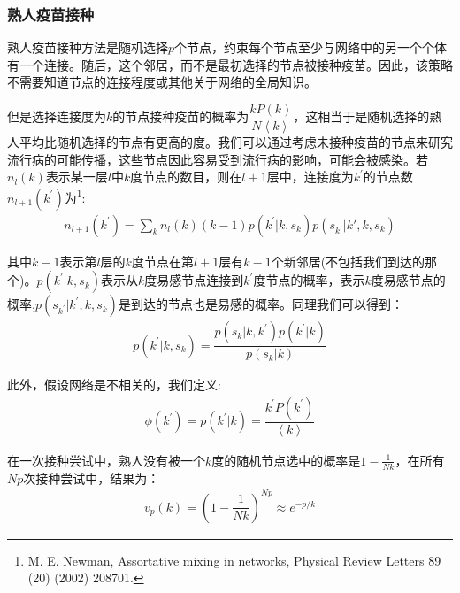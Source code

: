 \documentclass[UTF8]{ctexart}
\begin{document}
\subsubsection{熟人疫苗接种}
熟人疫苗接种方法是随机选择$p$个节点，约束每个节点至少与网络中的另一个个体有一个连接。随后，这个邻居，而不是最初选择的节点被接种疫苗。因此，该策略不需要知道节点的连接程度或其他关于网络的全局知识。
\par 但是选择连接度为$k$的节点接种疫苗的概率为$\dfrac{kP(k)}{N\left\langle k\right\rangle}$，这相当于是随机选择的熟人平均比随机选择的节点有更高的度。我们可以通过考虑未接种疫苗的节点来研究流行病的可能传播，这些节点因此容易受到流行病的影响，可能会被感染。若$n_{l}(k)$表示某一层$l$中$k$度节点的数目，则在$l+1$层中，连接度为$k^{\prime}$的节点数$n_{l+1}(k^{\prime})$为\footnote{M. E. Newman, Assortative mixing in networks, Physical Review Letters 89 (20) (2002) 208701.}:
\begin{equation}
	\begin{aligned}
		n_{l+1}(k^{\prime})=\sum\limits_{k}n_{l}(k)(k-1)p(k^{\prime}|k,s_{k})p(s_{k^{\prime}}|k\prime,k,s_{k})
	\end{aligned}
\end{equation}
\par 其中$k−1$表示第$l$层的$k$度节点在第$l+1$层有$k−1$个新邻居(不包括我们到达的那个)。$p(k^{\prime}|k,s_{k})$表示从$k$度易感节点连接到$k^{\prime}$度节点的概率，表示$k$度易感节点的概率,$p(s_{k^{\prime}}|k^{\prime},k,s_{k})$是到达的节点也是易感的概率。同理我们可以得到：
\begin{equation}
	\begin{aligned}
		p(k^{\prime}|k,s_{k})=\dfrac{p(s_{k}|k,k^{\prime})p(k^{\prime}|k)}{p(s_{k}|k)}
	\end{aligned}
\end{equation}
\par 此外，假设网络是不相关的，我们定义:
\begin{equation}
	\begin{aligned}
		\phi(k^{\prime})=p(k^{\prime}|k)=\dfrac{k^{\prime}P(k^{\prime})}{\left\langle k\right\rangle}
	\end{aligned}
\end{equation}
\par 在一次接种尝试中，熟人没有被一个$k$度的随机节点选中的概率是$1−\frac{1}{Nk}$，在所有$Np$次接种尝试中，结果为：
\begin{equation}
	\begin{aligned}
		v_{p}(k)=(1-\dfrac{1}{Nk})^{Np}\approx e^{-p/k}
	\end{aligned}
\end{equation}
\end{document}
